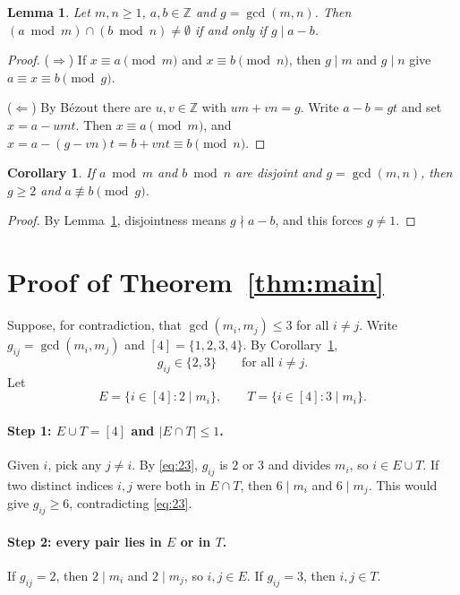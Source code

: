 \documentclass[11pt]{article}
\newtheorem{lemma}[theorem]{Lemma}
\newtheorem{corollary}[theorem]{Corollary}
\theoremstyle{remark}
\theoremstyle{definition}
\begin{document}
\begin{lemma}\label{lem:crt}
Let $m,n\ge1$, $a,b\in\mathbb{Z}$ and $g=\gcd(m,n)$. Then
$(a\bmod m)\cap(b\bmod n)\ne\emptyset$ if and only if $g\mid a-b$.
\end{lemma}

\begin{proof}
($\Rightarrow$) If $x\equiv a\pmod m$ and $x\equiv b\pmod n$, then $g\mid m$ and $g\mid n$ give
$a\equiv x\equiv b\pmod g$.

($\Leftarrow$) By B\'ezout there are $u,v\in\mathbb{Z}$ with $um+vn=g$. Write $a-b=gt$ and set
$x=a-umt$. Then $x\equiv a\pmod m$, and $x=a-(g-vn)t=b+vnt\equiv b\pmod n$.
\end{proof}

\begin{corollary}\label{cor:small}
If $a\bmod m$ and $b\bmod n$ are disjoint and $g=\gcd(m,n)$, then $g\ge2$ and $a\not\equiv b\pmod g$.
\end{corollary}

\begin{proof}
By Lemma~\ref{lem:crt}, disjointness means $g\nmid a-b$, and this forces $g\ne1$.
\end{proof}

\section{Proof of Theorem~\ref{thm:main}}

Suppose, for contradiction, that $\gcd(m_i,m_j)\le3$ for all $i\ne j$. Write $g_{ij}=\gcd(m_i,m_j)$
and $[4]=\{1,2,3,4\}$. By Corollary~\ref{cor:small},
\begin{equation}\label{eq:23}
  g_{ij}\in\{2,3\}\qquad\text{for all } i\ne j .
\end{equation}
Let
\[
  E=\{i\in[4]: 2\mid m_i\},\qquad T=\{i\in[4]: 3\mid m_i\}.
\]

\paragraph{Step 1: $E\cup T=[4]$ and $|E\cap T|\le1$.}
Given $i$, pick any $j\ne i$. By \eqref{eq:23}, $g_{ij}$ is $2$ or $3$ and divides $m_i$, so
$i\in E\cup T$. If two distinct indices $i,j$ were both in $E\cap T$, then $6\mid m_i$ and $6\mid m_j$.
This would give $g_{ij}\ge6$, contradicting \eqref{eq:23}.

\paragraph{Step 2: every pair lies in $E$ or in $T$.}
If $g_{ij}=2$, then $2\mid m_i$ and $2\mid m_j$, so $i,j\in E$. If $g_{ij}=3$, then $i,j\in T$.
\end{document}
